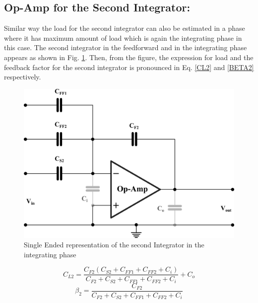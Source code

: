 \subsection{Op-Amp for the Second Integrator:}
Similar way the load for the second integrator can also be estimated in a phase where it has maximum amount of load which is again the integrating phase in this case. The second integrator in the feedforward and in the integrating phase appears as shown in Fig. \ref{INT2_INTPHS}. Then, from the figure, the expression for load and the feedback factor for the second integrator is pronounced in Eq. \ref{CL2} and \ref{BETA2} respectively.
\begin{figure}[h]
\centering
\includegraphics[width=0.6\columnwidth]{Chap05/Figures/integrator2.png}
\caption{Single Ended representation of the second Integrator in the integrating phase}
\label{INT2_INTPHS}
\end{figure}
\begin{equation}
    C_{L2}=\frac{C_{F2}\left(C_{S2}+C_{FF1}+C_{FF2}+C_{i}\right)}{C_{F2}+C_{S2}+C_{FF1}+C_{FF2}+C_{i}}+C_{o}
    \label{CL2}
\end{equation}
\begin{equation}
    \beta_{2}=\frac{C_{F2}}{C_{F2}+C_{S2}+C_{FF1}+C_{FF2}+C_{i}}
    \label{BETA2}
\end{equation}

